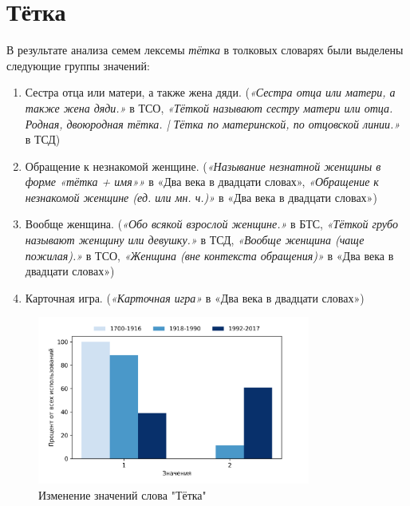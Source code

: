 \section*{Тётка}

В результате анализа семем лексемы \textit{тётка} в толковых словарях были выделены следующие группы значений:

\begin{enumerate}
    \item Сестра отца или матери, а также жена дяди.
    (\textit{«Сестра отца или матери, а также жена дяди.»} в ТСО,
    \textit{«Тёткой называют сестру матери или отца. Родная, двоюродная тётка. | Тётка по материнской, по отцовской линии.»} в ТСД)

    \item Обращение к незнакомой женщине.
    (\textit{«Называние незнатной женщины в форме «тётка + имя»»} в «Два века в двадцати словах»,
    \textit{«Обращение к незнакомой женщине (ед. или мн. ч.)»} в «Два века в двадцати словах»)

    \item Вообще женщина.
    (\textit{«Обо всякой взрослой женщине.»} в БТС,
    \textit{«Тёткой грубо называют женщину или девушку.»} в ТСД,
    \textit{«Вообще женщина (чаще пожилая).»} в ТСО,
    \textit{«Женщина (вне контекста обращения)»} в «Два века в двадцати словах»)

%
    \item Карточная игра.
    (\textit{«Карточная игра»} в «Два века в двадцати словах»)
\end{enumerate}

\begin{figure}[H]
	\centering
	\includegraphics[width=0.8\textwidth]{img/visualizations/tetka_minimal}
	\caption{Изменение значений слова "Тётка"}
	\label{fig:Тётка}
\end{figure}

